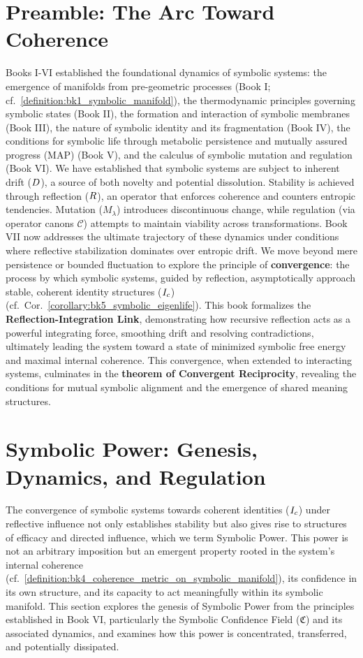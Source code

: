 ﻿\section{Preamble: The Arc Toward Coherence}
\label{sec:bk7_preamble_the_arc_toward_coherence} %
Books I-VI established the foundational dynamics of symbolic systems: the emergence of manifolds from pre-geometric processes (Book I; cf.~\ref{definition:bk1_symbolic_manifold}), the thermodynamic principles governing symbolic states (Book II), the formation and interaction of symbolic membranes (Book III), the nature of symbolic identity and its fragmentation (Book IV), the conditions for symbolic life through metabolic persistence and mutually assured progress (MAP) (Book V), and the calculus of symbolic mutation and regulation (Book VI).
We have established that symbolic systems are subject to inherent drift (\(D\)), a source of both novelty and potential dissolution. Stability is achieved through reflection (\(R\)), an operator that enforces coherence and counters entropic tendencies. Mutation (\(M_\lambda\)) introduces discontinuous change, while regulation (via operator canons \(\mathcal{C}\)) attempts to maintain viability across transformations.
Book VII now addresses the ultimate trajectory of these dynamics under conditions where reflective stabilization dominates over entropic drift. We move beyond mere persistence or bounded fluctuation to explore the principle of \textbf{convergence}: the process by which symbolic systems, guided by reflection, asymptotically approach stable, coherent identity structures (\(I_c\)) (cf.~Cor.~\ref{corollary:bk5_symbolic_eigenlife}). This book formalizes the \textbf{Reflection-Integration Link}, demonstrating how recursive reflection acts as a powerful integrating force, smoothing drift and resolving contradictions, ultimately leading the system toward a state of minimized symbolic free energy and maximal internal coherence. This convergence, when extended to interacting systems, culminates in the \textbf{theorem of Convergent Reciprocity}, revealing the conditions for mutual symbolic alignment and the emergence of shared meaning structures.

\section{Symbolic Power: Genesis, Dynamics, and Regulation}
\label{sec:bk7_symbolic_power_genesis_dynamics_regulation}
The convergence of symbolic systems towards coherent identities (\(I_c\)) under reflective influence not only establishes stability but also gives rise to structures of efficacy and directed influence, which we term Symbolic Power. This power is not an arbitrary imposition but an emergent property rooted in the system's internal coherence (cf.~\ref{definition:bk4_coherence_metric_on_symbolic_manifold}), its confidence in its own structure, and its capacity to act meaningfully within its symbolic manifold. This section explores the genesis of Symbolic Power from the principles established in Book VI, particularly the Symbolic Confidence Field (\(\mathfrak{C}\)) and its associated dynamics, and examines how this power is concentrated, transferred, and potentially dissipated.

